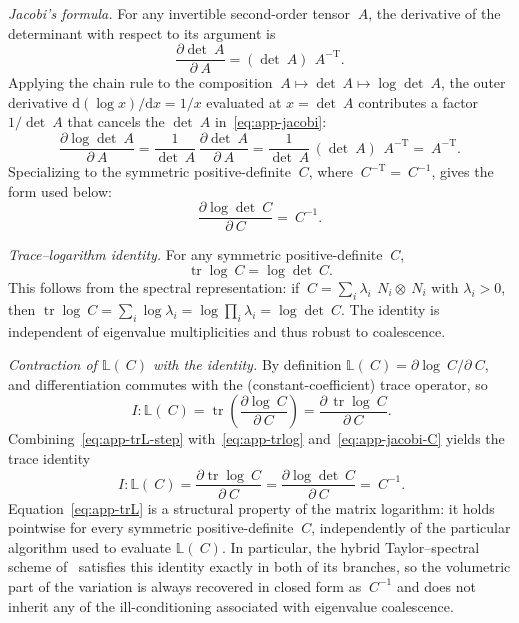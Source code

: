\documentclass[12pt]{article}
\newcommand{\C}{~C}
\DeclareMathOperator{\trace}{tr}
\begin{document}
\textit{Jacobi's formula.} For any invertible second-order tensor
$~A$, the derivative of the determinant with respect to its
argument is
\begin{equation}
  \label{eq:app-jacobi}
  \frac{\partial \det ~A}{\partial ~A}
  =
  (\det ~A)\,~A^{-\mathrm{T}}.
\end{equation}
Applying the chain rule to the composition $~A \mapsto \det ~A
\mapsto \log \det ~A$, the outer derivative
$\mathrm{d}(\log x)/\mathrm{d}x = 1/x$ evaluated at $x = \det ~A$
contributes a factor $1/\det ~A$ that cancels the $\det ~A$
in~\eqref{eq:app-jacobi}:
\begin{equation}
  \label{eq:app-jacobi-log}
  \frac{\partial \log \det ~A}{\partial ~A}
  =
  \frac{1}{\det ~A}\,\frac{\partial \det ~A}{\partial ~A}
  =
  \frac{1}{\det ~A}\,(\det ~A)\,~A^{-\mathrm{T}}
  =
  ~A^{-\mathrm{T}}.
\end{equation}
Specializing to the symmetric positive-definite $\C$, where
$\C^{-\mathrm{T}} = \C^{-1}$, gives the form used below:
\begin{equation}
  \label{eq:app-jacobi-C}
  \frac{\partial \log \det \C}{\partial \C}
  =
  \C^{-1}.
\end{equation}

\textit{Trace--logarithm identity.} For any symmetric positive-definite
$\C$,
\begin{equation}
  \label{eq:app-trlog}
  \trace \log \C
  =
  \log \det \C.
\end{equation}
This follows from the spectral representation: if
$\C = \sum_{i} \lambda_{i}\, ~N_{i} \otimes ~N_{i}$ with
$\lambda_{i} > 0$, then
$\trace \log \C = \sum_{i} \log \lambda_{i}
 = \log \prod_{i} \lambda_{i} = \log \det \C$.
The identity is independent of eigenvalue multiplicities and thus
robust to coalescence.

\textit{Contraction of $\mathbb{L}(\C)$ with the identity.} By
definition $\mathbb{L}(\C) = \partial \log \C / \partial \C$, and
differentiation commutes with the (constant-coefficient) trace
operator, so
\begin{equation}
  \label{eq:app-trL-step}
  ~I : \mathbb{L}(\C)
  =
  \trace \left( \frac{\partial \log \C}{\partial \C} \right)
  =
  \frac{\partial\, \trace \log \C}{\partial \C}.
\end{equation}
Combining~\eqref{eq:app-trL-step} with~\eqref{eq:app-trlog}
and~\eqref{eq:app-jacobi-C} yields the trace identity
\begin{equation}
  \label{eq:app-trL}
  ~I : \mathbb{L}(\C)
  =
  \frac{\partial \trace \log \C}{\partial \C}
  =
  \frac{\partial \log \det \C}{\partial \C}
  =
  \C^{-1}.
\end{equation}
Equation~\eqref{eq:app-trL} is a structural property of the matrix
logarithm: it holds pointwise for every symmetric positive-definite
$\C$, independently of the particular algorithm used to evaluate
$\mathbb{L}(\C)$. In particular, the hybrid Taylor--spectral scheme
of~\citet{Ortiz.Radovitzky.Repetto:2001} satisfies this identity
exactly in both of its branches, so the volumetric part of the
variation is always recovered in closed form as $\C^{-1}$ and does
not inherit any of the ill-conditioning associated with eigenvalue
coalescence.
\end{document}
